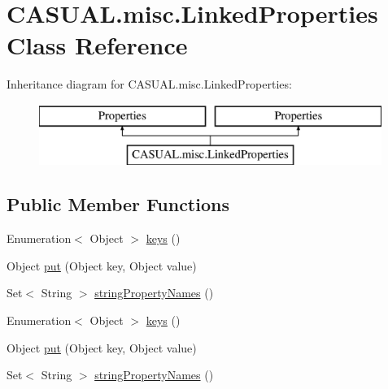 \hypertarget{class_c_a_s_u_a_l_1_1misc_1_1_linked_properties}{\section{C\-A\-S\-U\-A\-L.\-misc.\-Linked\-Properties Class Reference}
\label{class_c_a_s_u_a_l_1_1misc_1_1_linked_properties}
}
Inheritance diagram for C\-A\-S\-U\-A\-L.\-misc.\-Linked\-Properties\-:\begin{figure}[H]
\begin{center}
\leavevmode
\includegraphics[height=2.000000cm]{class_c_a_s_u_a_l_1_1misc_1_1_linked_properties}
\end{center}
\end{figure}
\subsection*{Public Member Functions}
\begin{DoxyCompactItemize}
\item 
Enumeration$<$ Object $>$ \hyperlink{class_c_a_s_u_a_l_1_1misc_1_1_linked_properties_a70ea068b7aef6f29a3221e6de67f962f}{keys} ()
\item 
Object \hyperlink{class_c_a_s_u_a_l_1_1misc_1_1_linked_properties_a56ef8e557095be6869bf1c4562cd6deb}{put} (Object key, Object value)
\item 
Set$<$ String $>$ \hyperlink{class_c_a_s_u_a_l_1_1misc_1_1_linked_properties_a2bc321d6ef4204f9d01b26fae22ae510}{string\-Property\-Names} ()
\item 
Enumeration$<$ Object $>$ \hyperlink{class_c_a_s_u_a_l_1_1misc_1_1_linked_properties_a70ea068b7aef6f29a3221e6de67f962f}{keys} ()
\item 
Object \hyperlink{class_c_a_s_u_a_l_1_1misc_1_1_linked_properties_a56ef8e557095be6869bf1c4562cd6deb}{put} (Object key, Object value)
\item 
Set$<$ String $>$ \hyperlink{class_c_a_s_u_a_l_1_1misc_1_1_linked_properties_a2bc321d6ef4204f9d01b26fae22ae510}{string\-Property\-Names} ()
\end{DoxyCompactItemize}


